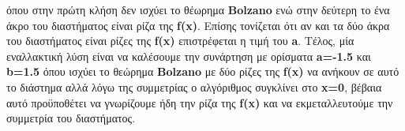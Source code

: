 \documentclass[First Project.tex]{subfiles}
\begin{document}
όπου στην πρώτη κλήση δεν ισχύει το θέωρημα \textlatin{\textbf{Bolzano}} ενώ στην δεύτερη το ένα άκρο του διαστήματος είναι ρίζα της 
\textlatin{\textbf{f(x)}}. Επίσης τονίζεται ότι αν και τα δύο άκρα του διαστήματος είναι ρίζες της \textlatin{\textbf{f(x)}} επιστρέφεται 
η τιμή του \textlatin{\textbf{a}}. Τέλος, μία εναλλακτική λύση είναι να καλέσουμε την συνάρτηση με ορίσματα \textbf{\textlatin{a=-1.5}} και
\textbf{\textlatin{b=1.5}} όπου ισχύει το θεώρημα \textlatin{\textbf{Bolzano}} με δύο ρίζες της \textlatin{\textbf{f(x)}} να ανήκουν σε αυτό
το διάστημα αλλά λόγω της συμμετρίας ο αλγόριθμος συγκλίνει στο \textlatin{\textbf{x=0}}, βέβαια αυτό προϋποθέτει να γνωρίζουμε ήδη την ρίζα
της \textlatin{\textbf{f(x)}} και να εκμεταλλευτούμε την συμμετρία του διαστήματος.
\newpage
\end{document}
